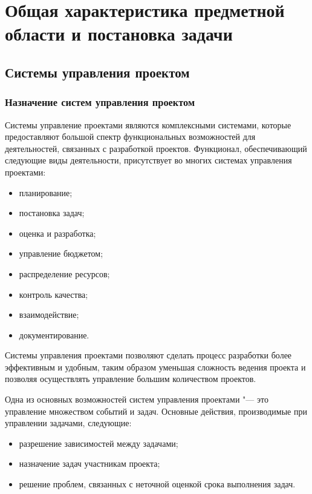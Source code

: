 \chapter{Общая характеристика предметной области и постановка задачи}
\section{Системы управления проектом}
\subsection{Назначение систем управления проектом}

Системы управление проектами являются комплексными системами, которые
предоставляют большой спектр функциональных возможностей для деятельностей,
связанных с разработкой проектов. Функционал, обеспечивающий следующие виды
деятельности, присутствует во многих системах управления проектами:
\begin{itemize}
  \item планирование;
  \item постановка задач;
  \item оценка и разработка;
  \item управление бюджетом;
  \item распределение ресурсов;
  \item контроль качества;
  \item взаимодействие;
  \item документирование.
\end{itemize}
Системы управления проектами позволяют сделать процесс разработки более
эффективным и удобным, таким образом уменьшая сложность ведения проекта и
позволяя осуществлять управление большим количеством проектов. 

Одна из основных возможностей систем управления проектами "--- это
управление множеством событий и задач. Основные действия, производимые
при управлении задачами, следующие:
\begin{itemize}
  \item разрешение зависимостей между задачами;
  \item назначение задач участникам проекта;
  \item решение проблем, связанных с неточной оценкой срока выполнения задач.
\end{itemize}

